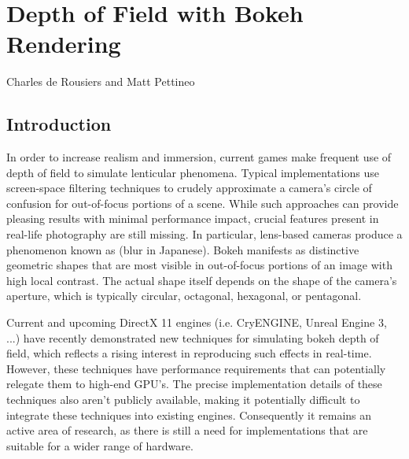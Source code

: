 \chapter{Depth of Field with Bokeh Rendering}{Charles de Rousiers and Matt Pettineo}
\label{BokehRendering}

\section{Introduction}

In order to increase realism and immersion, current games make frequent use of depth of field to simulate lenticular phenomena. Typical implementations use screen-space filtering techniques to crudely approximate a camera's circle of confusion for out-of-focus portions of a scene. While such approaches can provide pleasing results with minimal performance impact, crucial features present in real-life photography are still missing. In particular, lens-based cameras produce a phenomenon known as \bokeh (blur in Japanese). Bokeh manifests as distinctive geometric shapes that are most visible in out-of-focus portions of an image with high local contrast. The actual shape itself depends on the shape of the camera’s aperture, which is typically circular, octagonal, hexagonal, or pentagonal.

Current and upcoming DirectX 11 engines (i.e. CryENGINE, Unreal Engine 3, ...) have recently demonstrated new techniques for simulating bokeh depth of field, which reflects a rising interest in reproducing such effects in real-time. However, these techniques have performance requirements that can potentially relegate them to high-end GPU's. The precise implementation details of these techniques also aren't publicly available, making it potentially difficult to integrate these techniques into existing engines. Consequently it remains an active area of research, as there is still a need for implementations that are suitable for a wider range of hardware.

